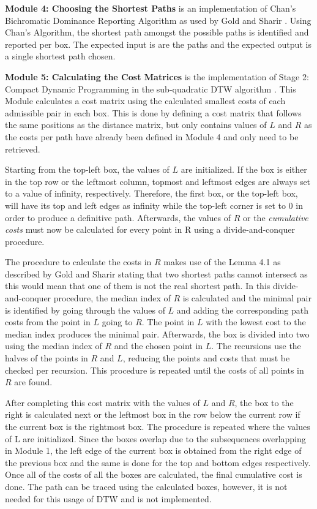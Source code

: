 \textbf{Module 4: Choosing the Shortest Paths} is an implementation of Chan's Bichromatic Dominance Reporting Algorithm as used by Gold and Sharir \cite{OmerGold}. Using Chan's Algorithm, the shortest path amongst the possible paths is identified and reported per box. The expected input is are the paths and the expected output is a single shortest path chosen.

\textbf{Module 5: Calculating the Cost Matrices} is the implementation of Stage 2: Compact Dynamic Programming in the sub-quadratic DTW algorithm \cite{OmerGold}. This Module calculates a cost matrix using the calculated smallest costs of each admissible pair in each box. This is done by defining a cost matrix that follows the same positions as the distance matrix, but only contains values of $L$ and $R$ as the costs per path have already been defined in Module 4 and only need to be retrieved.

Starting from the top-left box, the values of $L$ are initialized. If the box is either in the top row or the leftmost column, topmost and leftmost edges are always set to a value of infinity, respectively. Therefore, the first box, or the top-left box, will have its top and left edges as infinity while the top-left corner is set to 0 in order to produce a definitive path. Afterwards, the values of $R$ or the \textit{cumulative costs} must now be calculated for every point in R using a divide-and-conquer procedure.

The procedure to calculate the costs in $R$ makes use of the Lemma 4.1 as described by Gold and Sharir \cite{OmerGold} stating that two shortest paths cannot intersect as this would mean that one of them is not the real shortest path. In this divide-and-conquer procedure, the median index of $R$ is calculated and the minimal pair is identified by going through the values of $L$ and adding the corresponding path costs from the point in $L$ going to $R$. The point in $L$ with the lowest cost to the median index produces the minimal pair. Afterwards, the box is divided into two using the median index of $R$ and the chosen point in $L$. The recursions use the halves of the points in $R$ and $L$, reducing the points and costs that must be checked per recursion. This procedure is repeated until the costs of all points in $R$ are found.

After completing this cost matrix with the values of $L$ and $R$, the box to the right is calculated next or the leftmost box in the row below the current row if the current box is the rightmost box. The procedure is repeated where the values of L are initialized. Since the boxes overlap due to the subsequences overlapping in Module 1, the left edge of the current box is obtained from the right edge of the previous box and the same is done for the top and bottom edges respectively. Once all of the costs of all the boxes are calculated, the final cumulative cost is done. The path can be traced using the calculated boxes, however, it is not needed for this usage of DTW and is not implemented.

